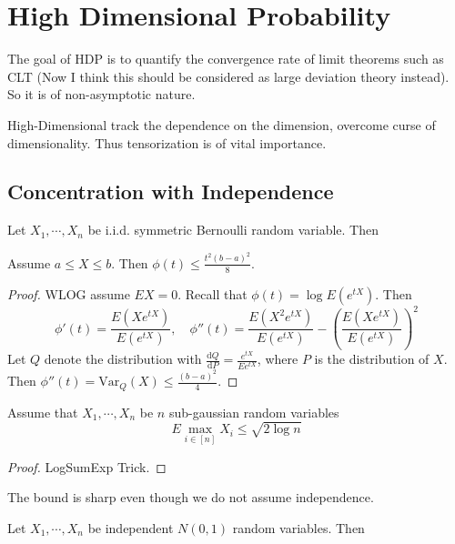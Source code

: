 \chapter{High Dimensional Probability}
The goal of HDP is to quantify the convergence rate of limit theorems such as CLT (Now I think this should be considered as large deviation theory instead). So it is of non-asymptotic nature.

High-Dimensional track the dependence on the dimension, overcome curse of dimensionality. Thus tensorization is of vital importance.
\section{Concentration with Independence}
\begin{theorem}
    Let $X_1,\cdots,X_n$ be i.i.d. symmetric Bernoulli random variable. Then 
\end{theorem}

\begin{definition}
    
\end{definition}


\begin{definition}
    
\end{definition}


\begin{lemma}
    Assume $a\le X\le b$. Then $\phi(t)\le \frac{t^2(b-a)^2}{8}$.
\end{lemma}
\begin{proof}
    WLOG assume $EX=0$. Recall that $\phi(t)=\log E(e^{tX})$. Then 
    \[\phi'(t)=\frac{E(Xe^{tX})}{E(e^{tX})},\quad \phi''(t)=\frac{E(X^2e^{tX})}{E(e^{tX})}-(\frac{E(Xe^{tX})}{E(e^{tX})})^2\]
    Let $Q$ denote the distribution with $\frac{\mathrm{d} Q}{\mathrm{d} P} = \frac{e^{tX}}{Ee^{tX}} $, where $P$ is the distribution of $X$.
    Then $\phi''(t)=\text{Var}_Q(X)\le \frac{(b-a)^2}{4}$.
\end{proof}

\begin{lemma}
    Assume that $X_1,\cdots,X_n$ be $n$ sub-gaussian random variables
    \[E\max_{i\in[n]}X_i\le \sqrt{2\log n}\]
\end{lemma}
\begin{proof}
    LogSumExp Trick.
\end{proof}
\begin{remark}
    The bound is sharp even though we do not assume independence.
\end{remark}
\begin{example}
    Let $X_1,\cdots,X_n$ be independent $N(0,1)$ random variables. Then 
\end{example}

